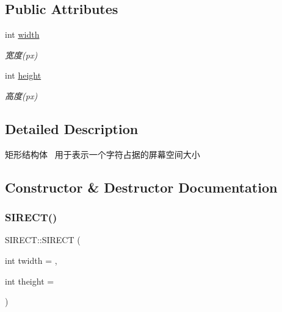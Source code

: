 \subsection*{Public Attributes}
\begin{DoxyCompactItemize}
\item 
\mbox{\label{struct_s_i_r_e_c_t_a99dbd77d045cc587f0c1f40bbba99ac8}} 
int \hyperlink{struct_s_i_r_e_c_t_a99dbd77d045cc587f0c1f40bbba99ac8}{width}
\begin{DoxyCompactList}\small\item\em 宽度(px) \end{DoxyCompactList}\item 
\mbox{\label{struct_s_i_r_e_c_t_a6577f3092897d4bef17aab5ec4d62819}} 
int \hyperlink{struct_s_i_r_e_c_t_a6577f3092897d4bef17aab5ec4d62819}{height}
\begin{DoxyCompactList}\small\item\em 高度(px) \end{DoxyCompactList}\end{DoxyCompactItemize}


\subsection{Detailed Description}
矩形结构体~\newline
用于表示一个字符占据的屏幕空间大小 

\subsection{Constructor \& Destructor Documentation}
\mbox{\label{struct_s_i_r_e_c_t_a845bf8054bfcbdf5336798f61d220d05}} 
\subsubsection{\texorpdfstring{S\+I\+R\+E\+C\+T()}{SIRECT()}\hspace{0.1cm}{\footnotesize\ttfamily [1/2]}}
{\footnotesize\ttfamily S\+I\+R\+E\+C\+T\+::\+S\+I\+R\+E\+CT (\begin{DoxyParamCaption}\item[{int}]{twidth = {},  }\item[{int}]{theight = {} }\end{DoxyParamCaption})\hspace{0.3cm}{\ttfamily [inline]}}


